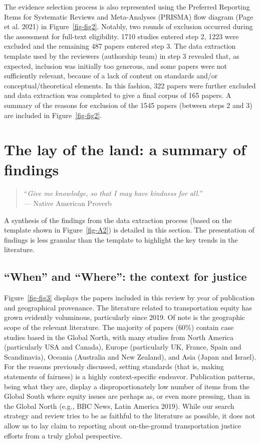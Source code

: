 \documentclass[12pt, oneside]{report}
\begin{document}
The evidence selection process is also represented using the Preferred
Reporting Items for Systematic Reviews and Meta-Analyses (PRISMA) flow
diagram (Page et al. 2021) in Figure~\ref{fig-fig2}. Notably, two rounds
of exclusion occurred during the assessment for full-text eligibility.
1710 studies entered step 2, 1223 were excluded and the remaining 487
papers entered step 3. The data extraction template used by the
reviewers (authorship team) in step 3 revealed that, as expected,
inclusion was initially too generous, and some papers were not
sufficiently relevant, because of a lack of content on standards and/or
conceptual/theoretical elements. In this fashion, 322 papers were
further excluded and data extraction was completed to give a final
corpus of 165 papers. A summary of the reasons for exclusion of the 1545
papers (between steps 2 and 3) are included in Figure~\ref{fig-fig2}.

\hypertarget{sect4}{%
\section{The lay of the land: a summary of findings}\label{sect4}}

\begin{quote}
``\emph{Give me knowledge, so that I may have kindness for all.}''\\
--- Native American Proverb
\end{quote}

A synthesis of the findings from the data extraction process (based on
the template shown in Figure~\ref{fig-A2}) is detailed in this section.
The presentation of findings is less granular than the template to
highlight the key trends in the literature.

\hypertarget{when-and-where-the-context-for-justice}{%
\subsection{``When'' and ``Where'': the context for
justice}\label{when-and-where-the-context-for-justice}}

Figure~\ref{fig-fig3} displays the papers included in this review by
year of publication and geographical provenance. The literature related
to transportation equity has grown evidently voluminous, particularly
since 2019. Of note is the geographic scope of the relevant literature.
The majority of papers (60\%) contain case studies based in the Global
North, with many studies from North America (particularly USA and
Canada), Europe (particularly UK, France, Spain and Scandinavia),
Oceania (Australia and New Zealand), and Asia (Japan and Israel). For
the reasons previously discussed, setting standards (that is, making
statements of fairness) is a highly context-specific endeavor.
Publication patterns, being what they are, display a disproportionately
low number of items from the Global South where equity issues are
perhaps as, or even more pressing, than in the Global North (e.g., BBC
News, Latin America 2019). While our search strategy and review tries to
be as faithful to the literature as possible, it does not allow us to
lay claim to reporting about on-the-ground transportation justice
efforts from a truly global perspective.
\end{document}
